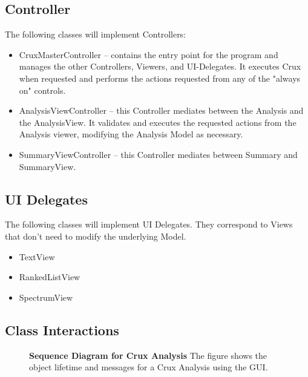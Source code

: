 \documentclass{article}
\begin{document}
\subsection{Controller}

The following classes will implement Controllers:

\begin{itemize}
\item CruxMasterController -- contains the entry
point for the program and manages the other Controllers, Viewers, and UI-Delegates.
It executes Crux when requested and performs the actions requested from any of 
the "always on" controls.
\item AnalysisViewController -- this Controller mediates between
the Analysis and the AnalysisView. It validates and executes the 
requested actions from the Analysis viewer, modifying the Analysis Model
as necessary.
\item SummaryViewController -- this Controller mediates between
Summary and SummaryView.
\end{itemize}

\subsection{UI Delegates}

The following classes will implement UI Delegates. They correspond to Views
that don't need to modify the underlying Model.

\begin{itemize}
\item TextView 
\item RankedListView
\item SpectrumView
\end{itemize}

\subsection{Class Interactions}

\begin{figure}[ht]
\centering
\caption{{\bf Sequence Diagram for Crux Analysis}  The figure shows the 
object lifetime and messages for a Crux Analysis using the GUI.
  \label{figure:sequence}}
\end{figure}
\end{document}
